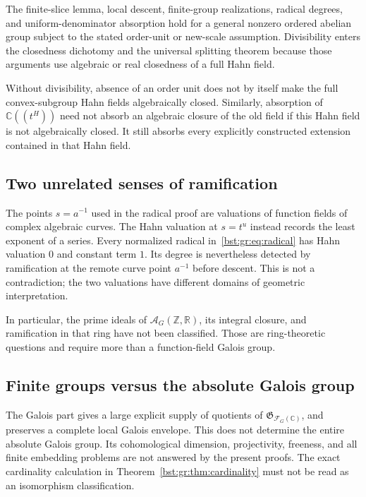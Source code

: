 \documentclass[11pt,letterpaper]{article}
\theoremstyle{definition}
\theoremstyle{remark}
\newcommand{\R}{\mathbb R}
\newcommand{\C}{\mathbb C}
\newcommand{\Z}{\mathbb Z}
\newcommand{\HH}[2]{#1((t^{#2}))}
\newcommand{\FF}[2]{\mathcal F_{#2}(#1)}
\newcommand{\AbsGal}[1]{\mathfrak G_{#1}}
\newcommand{\AAG}[3]{\mathcal A_{#3}(#1,#2)}
\begin{document}
The finite-slice lemma, local descent, finite-group realizations, radical
degrees, and uniform-denominator absorption hold for a general nonzero
ordered abelian group subject to the stated order-unit or new-scale
assumption. Divisibility enters the closedness dichotomy and the universal
splitting theorem because those arguments use algebraic or real closedness of
a full Hahn field.

Without divisibility, absence of an order unit does not by itself make the
full convex-subgroup Hahn fields algebraically closed. Similarly, absorption
of $\HH{\C}H$ need not absorb an algebraic closure of the old field if this
Hahn field is not algebraically closed. It still absorbs every explicitly
constructed extension contained in that Hahn field.

\subsection{Two unrelated senses of ramification}

The points $s=a^{-1}$ used in the radical proof are valuations of function
fields of complex algebraic curves. The Hahn valuation at $s=t^u$ instead
records the least exponent of a series. Every normalized radical
in~\eqref{bst:gr:eq:radical} has Hahn valuation $0$ and constant term $1$. Its
degree is nevertheless detected by ramification at the remote curve point
$a^{-1}$ before descent. This is not a contradiction; the two valuations have
different domains of geometric interpretation.

In particular, the prime ideals of $\AAG{\Z}{\R}G$, its integral closure, and
ramification in that ring have not been classified. Those are ring-theoretic
questions and require more than a function-field Galois group.

\subsection{Finite groups versus the absolute Galois group}

The Galois part gives a large explicit supply of quotients of
$\AbsGal{\FF{\C}G}$, and preserves a complete local Galois envelope. This does
not determine the entire absolute Galois group. Its cohomological dimension,
projectivity, freeness, and all finite embedding problems are not answered by
the present proofs. The exact cardinality calculation in
Theorem~\ref{bst:gr:thm:cardinality} must not be read as an isomorphism
classification.
\end{document}
